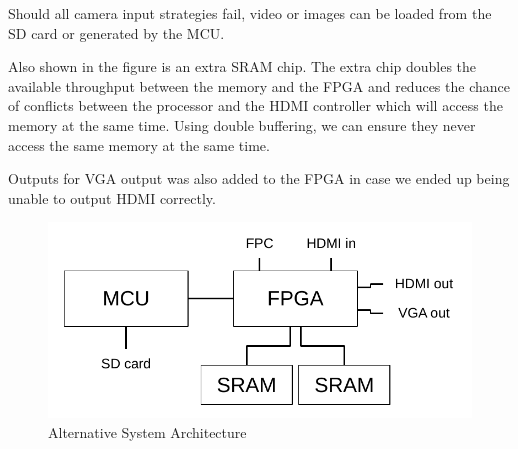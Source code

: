 Should all camera input strategies fail, video or images can be loaded from the SD card or generated by the MCU. 

Also shown in the figure is an extra SRAM chip.
The extra chip doubles the available throughput between the memory and the FPGA and reduces the chance of conflicts between the processor and the HDMI controller which will access the memory at the same time. Using double buffering, we can ensure they never access the same memory at the same time.

Outputs for VGA output was also added to the FPGA in case we ended up being unable to output HDMI correctly.

\begin{figure}
    \centering
    \includegraphics{img/SystemArchitectureAlternative.pdf}
    \caption{Alternative System Architecture}
    \label{fig:SystemArchitectureAlternative}
\end{figure}
